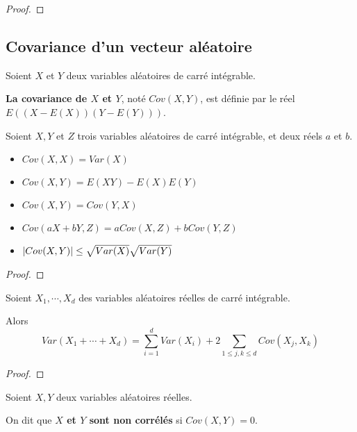 \ifdefined\outputproof
\begin{proof}

\end{proof}

\subsection{Covariance d'un vecteur aléatoire}

\begin{definition}
	Soient $X$ et $Y$ deux variables aléatoires de carré intégrable.

	\textbf{La covariance de $X$ et $Y$}, noté $Cov(X, Y)$, est définie par le
	réel $E( (X - E(X)) (Y - E(Y)) )$.
\end{definition}

\begin{proposition}
	Soient $X, Y$ et $Z$ trois variables aléatoires de carré intégrable, et deux
	réels $a$ et $b$.

	\begin{itemize}
		\item $Cov(X, X) = Var(X)$
		\item $Cov(X, Y) = E(XY) - E(X) E(Y)$
		\item $Cov(X, Y) = Cov(Y, X)$
		\item $Cov(aX + bY, Z) = a Cov(X, Z) + b Cov(Y, Z)$
		\item $\abs{Cov(X, Y)} \leq \sqrt{Var(X)} \sqrt{Var(Y)}$
	\end{itemize}
\end{proposition}

\ifdefined\outputproof
\begin{proof}

\end{proof}

\begin{proposition}
	Soient $X_{1}, \cdots, X_{d}$ des variables aléatoires réelles de carré intégrable.

	Alors
	\begin{equation}
		Var(X_{1} + \cdots + X_{d}) = \sum_{i = 1}^{d} Var(X_{i}) + 2
		\sum_{1 \leq j, k \leq d} Cov(X_{j}, X_{k})
	\end{equation}
\end{proposition}

\ifdefined\outputproof
\begin{proof}

\end{proof}

\begin{definition}
	Soient $X, Y$ deux variables aléatoires réelles.

	On dit que \textbf{$X$ et $Y$ sont non corrélés} si $Cov(X, Y) = 0$.
\end{definition}

